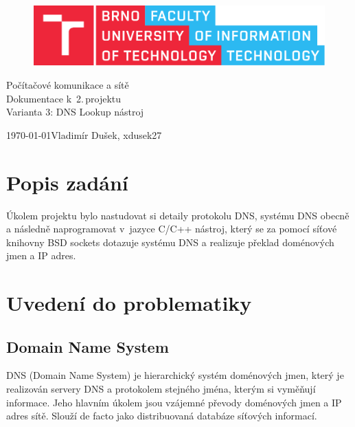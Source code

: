\documentclass[11pt, a4paper, titlepage]{article}
\begin{document}
\begin{titlepage}
	\begin{center}
		\begin{figure}[htb]
			\centering
			\includegraphics[width=0.85\hsize]{fitlogo.pdf}
		\end{figure}


		{\LARGE Počítačové komunikace a sítě} \\
		\bigskip
		{\Huge Dokumentace k~2.\,projektu} \\
		\bigskip
		{\LARGE Varianta 3: DNS Lookup nástroj}

	\end{center}
	{\Large \today \hfill Vladimír Dušek, xdusek27}
\end{titlepage}


\tableofcontents
\newpage


\section{Popis zadání}
	Úkolem projektu bylo nastudovat si detaily protokolu DNS, systému DNS obecně a následně naprogramovat v~jazyce C/C++ nástroj, který se za pomocí síťové knihovny BSD sockets dotazuje systému DNS a realizuje překlad doménových jmen a IP adres.


\section{Uvedení do problematiky}

	\subsection{Domain Name System}
	DNS (Domain Name System) je hierarchický systém doménových jmen, který je realizován servery DNS a protokolem stejného jména, kterým si vyměňují informace. Jeho hlavním úkolem jsou vzájemné převody doménových jmen a IP adres sítě. Slouží de facto jako distribuovaná databáze síťových informací.
\end{document}
